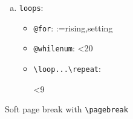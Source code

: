 \documentclass[a4paper,12pt]{amsart}
\theoremstyle{plain}
\theoremstyle{definition}
\theoremstyle{remark}
\numberwithin{equation}{section} %
\begin{document}
\begin{enumerate}[(a)]
	\item \verb|loops|:

	      \begin{itemize}
		      \item \verb|@for|:
		            \makeatletter
		            \@for\sun:={rising,setting}
		            \makeatother



		      \item \verb|@whilenum|:
		            \setcounter{int}{0}
		            \makeatletter
		            \@whilenum\value{int}<20
		            \makeatother

		      \item \verb|\loop...\repeat|:
		            \setcounter{int}{1}
		            \loop
		            \theint
		            \text{ }\addtocounter{int}{1}\quad\ifnum\value{int}<9
		            \repeat
	      \end{itemize}

\end{enumerate}

Soft page break with \verb*|\pagebreak|
\pagebreak
\end{document}
